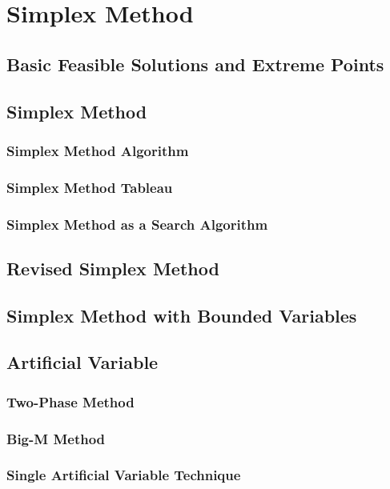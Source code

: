 	\chapter{Simplex Method}
		\section{Basic Feasible Solutions and Extreme Points}

		\section{Simplex Method}

			\subsection{Simplex Method Algorithm}

			\subsection{Simplex Method Tableau}

			\subsection{Simplex Method as a Search Algorithm}

		\section{Revised Simplex Method}

		\section{Simplex Method with Bounded Variables}

		\section{Artificial Variable}
			\subsection{Two-Phase Method}

			\subsection{Big-M Method}

			\subsection{Single Artificial Variable Technique}

